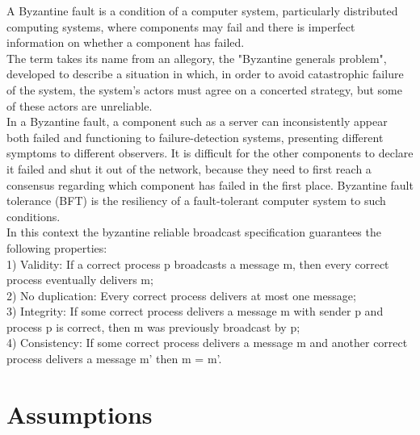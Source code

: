 \documentclass[12pt]{article}
\begin{document}
A Byzantine fault is a condition of a computer system, particularly distributed computing systems, where components may fail and there is imperfect information on whether a component has failed.\\ The term takes its name from an allegory, the "Byzantine generals problem", developed to describe a situation in which, in order to avoid catastrophic failure of the system, the system's actors must agree on a concerted strategy, but some of these actors are unreliable.\\
In a Byzantine fault, a component such as a server can inconsistently appear both failed and functioning to failure-detection systems, presenting different symptoms to different observers. It is difficult for the other components to declare it failed and shut it out of the network, because they need to first reach a consensus regarding which component has failed in the first place. Byzantine fault tolerance (BFT) is the resiliency of a fault-tolerant computer system to such conditions.\\
In this context the byzantine reliable broadcast specification guarantees the following properties:\\
1) Validity: If a correct process p broadcasts a message m, then every correct process eventually delivers m;\\
2) No duplication: Every correct process delivers at most one message;\\
3) Integrity: If some correct process delivers a message m with sender p and process p is correct, then m was previously broadcast by p;\\
4) Consistency: If some correct process delivers a message m and another correct process delivers a message m' then m = m'.

\newpage

\section{Assumptions}
\end{document}
